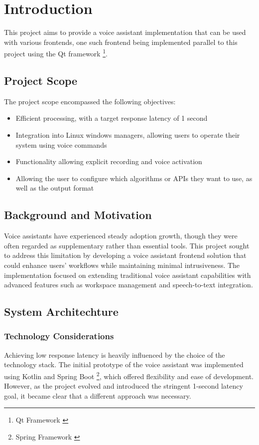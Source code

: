 \renewcommand*\chapterpagestyle{scrheadings}
\chapter{Introduction}

This project aims to provide a voice assistant implementation that can be used with various frontends,
one such frontend being implemented parallel to this project using the Qt framework \footnote{Qt Framework \cite{qt}}.

\section{Project Scope}
The project scope encompassed the following objectives:
\begin{itemize}
    \item Efficient processing, with a target response latency of 1 second
    \item Integration into Linux windows managers, allowing users to operate their system using voice commands
    \item Functionality allowing explicit recording and voice activation
    \item Allowing the user to configure which algorithms or APIs they want to use, as well as the output format
\end{itemize}

\section{Background and Motivation}
Voice assistants have experienced steady adoption growth,
though they were often regarded as supplementary rather than essential tools.
This project sought to address this limitation
by developing a voice assistant frontend solution that could enhance users' workflows
while maintaining minimal intrusiveness.
The implementation focused on extending traditional voice assistant capabilities
with advanced features such as workspace management and speech-to-text integration.

\section{System Architechture}
\subsection{Technology Considerations}
Achieving low response latency is heavily influenced by the choice of the technology stack.
The initial prototype of the voice assistant was implemented using Kotlin and Spring Boot
\footnote{Spring Framework \cite{spring}}, which offered flexibility and ease of development.
However, as the project evolved and introduced the stringent 1-second latency goal,
it became clear that a different approach was necessary.

